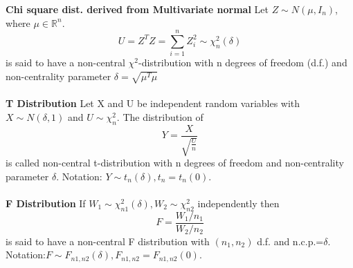 \documentclass{article}
\begin{document}
\textbf{Chi square dist. derived from Multivariate normal}
Let $Z \sim N(\mu, I_n)$, where $\mu \in \mathbb{R}^n$.
$$U = Z^T Z = \sum^n_{i=1} Z_i^2 \sim \chi^2_n(\delta)$$ is said to have a non-central $\chi^2$-distribution with n degrees of freedom (d.f.) and non-centrality parameter $\delta = \sqrt{\mu^T\mu}$
\\
\\
\textbf{T Distribution}
Let X and U be independent random variables with $X \sim N(\delta,1)$ and $U \sim \chi_n^2$. The
 distribution of
$$ Y = \frac{X}{\sqrt{\frac{U}{n}}}
$$
  is called non-central t-distribution with n degrees of freedom and non-centrality parameter $\delta$. Notation: $Y \sim t_n(\delta), t_n = t_n(0)$.
\\
\\
\textbf{F Distribution}
If $W_1 \sim \chi^2_{n1} (\delta), W_2 \sim \chi^2_{n2}$ independently then $$F = \frac{W_1/n_1}{W_2 /n_2}$$
is said to have a non-central F distribution with $(n_1,n_2)$ d.f. and n.c.p.=$\delta$.
         Notation:$F \sim F_{n1,n2}(\delta),F_{n1,n2} =F_{n1,n2}(0)$.
\end{document}
